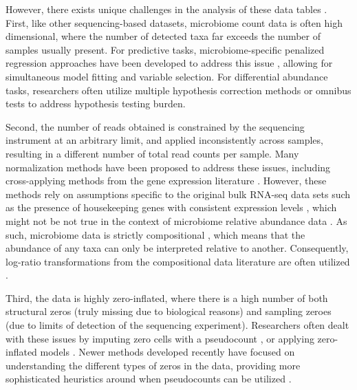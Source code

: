 \documentclass[10pt,letterpaper]{article}
\begin{document}
However, there exists unique challenges in the analysis of these data tables \cite{li2019,li2015}. First, like other sequencing-based datasets, microbiome count data is often high dimensional, where the number of detected taxa far exceeds the number of samples usually present. For predictive tasks, microbiome-specific penalized regression approaches have been developed to address this issue \cite{shi2016}, allowing for simultaneous model fitting and variable selection. For differential abundance tasks, researchers often utilize multiple hypothesis correction methods \cite{sankaran2014,benjamini1995} or omnibus tests \cite{chen2018} to address hypothesis testing burden. 

Second, the number of reads obtained is constrained by the sequencing instrument at an arbitrary limit, and applied inconsistently across samples, resulting in a different number of total read counts per sample. Many normalization methods \cite{weiss2017} have been proposed to address these issues, including cross-applying methods from the gene expression literature \cite{mcmurdie2014}. However, these methods rely on assumptions specific to the original bulk RNA-seq data sets such as the presence of housekeeping genes with consistent expression levels \cite{love2014}, which might not be not true in the context of microbiome relative abundance data \cite{quinn2019,quinn2018b}. As such, microbiome data is strictly compositional \cite{gloor2017}, which means that the abundance of any taxa can only be interpreted relative to another. Consequently, log-ratio transformations from the compositional data literature are often utilized \cite{aitchison1999}. 

Third, the data is highly zero-inflated, where there is a high number of both structural zeros (truly missing due to biological reasons) and sampling zeroes (due to limits of detection of the sequencing experiment). Researchers often dealt with these issues by imputing zero cells with a pseudocount \cite{kurtz2015}, or applying zero-inflated models \cite{chen2018, kaul2017}. Newer methods developed recently have focused on understanding the different types of zeros in the data, providing more sophisticated heuristics around when pseudocounts can be utilized \cite{kaul2017a}.   
\end{document}
